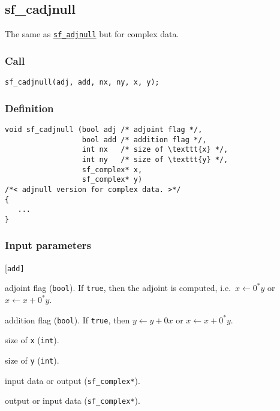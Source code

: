 \subsection{sf\_cadjnull}
The same as \hyperref[sec:adjnull]{\texttt{sf\_adjnull}} but for complex data.

\subsubsection*{Call}
\begin{verbatim}sf_cadjnull(adj, add, nx, ny, x, y);\end{verbatim}

\subsubsection*{Definition}
\begin{verbatim}
void sf_cadjnull (bool adj /* adjoint flag */, 
                  bool add /* addition flag */, 
                  int nx   /* size of \texttt{x} */, 
                  int ny   /* size of \texttt{y} */, 
                  sf_complex* x, 
                  sf_complex* y) 
/*< adjnull version for complex data. >*/
{
   ...    
}
\end{verbatim}

\subsubsection*{Input parameters}
\begin{desclist}{\tt }{\quad}[\tt add]
   \setlength\itemsep{0pt}
   \item[adj] adjoint flag (\texttt{bool}). If \texttt{true}, then the adjoint is computed, i.e.~$x\leftarrow 0^*y$ or $x\leftarrow x+0^*y$. 
   \item[add] addition flag (\texttt{bool}). If \texttt{true}, then $y\leftarrow y+0x$ or $x\leftarrow x+0^*y$.  
   \item[nx]  size of \texttt{x} (\texttt{int}). 
   \item[ny]  size of \texttt{y} (\texttt{int}). 
   \item[x]   input data or output (\texttt{sf\_complex*}).
   \item[y]   output or input data (\texttt{sf\_complex*}).
\end{desclist}





